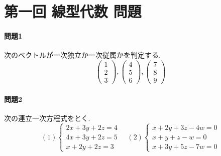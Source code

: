\documentclass[a4j,dvipdfmx]{jsarticle}
\begin{document}
    \part*{第一回 線型代数 問題}
    \subsection*{問題1}
        次のベクトルが一次独立か一次従属かを判定する.
        \begin{equation*}
            \begin{pmatrix}1 \\ 2 \\ 3 \end{pmatrix}, \begin{pmatrix}4 \\ 5\\ 6\end{pmatrix}, \begin{pmatrix}7 \\ 8 \\ 9 \end{pmatrix}
        \end{equation*}
    \subsection*{問題2}
        次の連立一次方程式をとく.
        \begin{equation*}
            (1)\left\{\begin{array}{c}
                2x+3y+2z=4\\
                4x+3y+2z=5\\
                x+2y+2z=3
            \end{array}\right.\quad 
            (2)\left\{\begin{array}{c}
                x+2y+3z-4w=0\\
                x+y+z-w=0\\
                x+3y+5z-7w=0
            \end{array}\right.
        \end{equation*}
\end{document}

